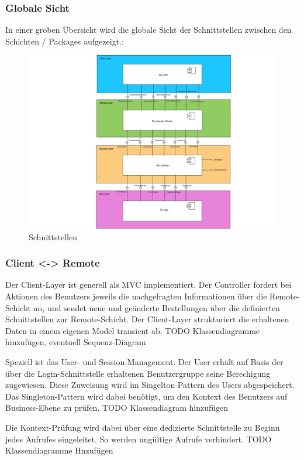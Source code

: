 \subsubsection{Globale Sicht}
In einer groben Übersicht wird die globale Sicht der Schnittstellen zwischen den Schichten / Packages aufgezeigt.:\\
\begin{figure}[H]
\centering
	\includegraphics[width=1.0\linewidth]{Images/Schnittstellen}
	\caption{Schnittstellen}
	\label{fig:schnittstellen}
\end{figure}

\subsubsection{Client <-> Remote}
Der Client-Layer ist generell als MVC implementiert. Der Controller fordert bei Aktionen des Benutzers jeweils die nachgefragten Informationen über die Remote-Schicht an, und sendet neue und geänderte Bestellungen über die definierten Schnittstellen zur Remote-Schicht.
Der Client-Layer strukturiert die erhaltenen Daten in einem eigenen Model transient ab.
TODO Klassendiagramme hinzufügen, eventuell Sequenz-Diagram

Speziell ist das User- und Session-Management. Der User erhält auf Basis der über die Login-Schnittstelle erhaltenen Benutzergruppe seine Berechigung zugewiesen. Diese Zuweisung wird im Singelton-Pattern des Users abgespeichert.
Das Singleton-Pattern wird dabei benötigt, um den Kontext des Benutzers auf Business-Ebene zu prüfen.
TODO Klassendiagram hinzufügen

Die Kontext-Prüfung wird dabei über eine dedizierte Schnittstelle zu Beginn jedes Aufrufes eingeleitet. So werden ungültige Aufrufe verhindert.
TODO Klassendiagramme Hnzufügen

